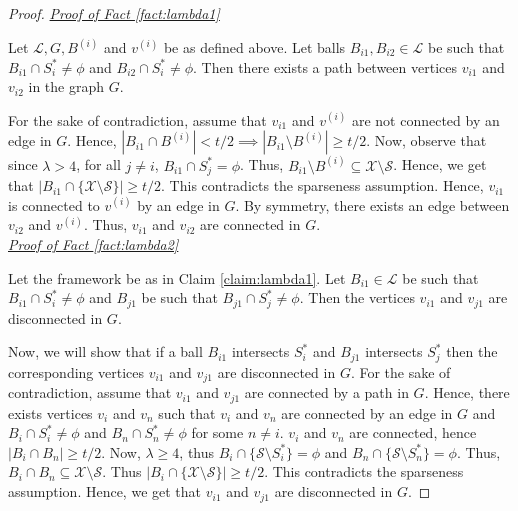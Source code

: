 \documentclass[11pt]{article}
\newcommand{\mc}{\mathcal}
\begin{document}
\begin{proof}
\noindent\textit{\underline{Proof of Fact \ref{fact:lambda1}}}
\begin{claim}
\label{claim:lambda1}
Let $\mc L, G, B^{(i)}$ and $v^{(i)}$ be as defined above. Let balls $B_{i1}, B_{i2} \in \mc L$ be such that $B_{i1} \cap S_i^* \neq \phi$ and $B_{i2} \cap S_i^* \neq \phi$. Then there exists a path between vertices $v_{i1}$ and $v_{i2}$ in the graph $G$.
\end{claim}
\vspace{-0.1in} For the sake of contradiction, assume that $v_{i1}$ and $v^{(i)}$ are not connected by an edge in $G$. Hence, $|B_{i1} \cap B^{(i)}| < t/2 \implies |B_{i1} \setminus B^{(i)}| \ge t/2$. Now, observe that since $\lambda > 4$, for all $j \neq i$, $B_{i1} \cap S_j^* = \phi$. Thus, $B_{i1} \setminus B^{(i)} \subseteq \mc X \setminus \mc S$. Hence, we get that $|B_{i1} \cap \{\mc X \setminus \mc S\}| \ge t/2$. This contradicts the sparseness assumption. Hence, $v_{i1}$ is connected to $v^{(i)}$ by an edge in $G$. By symmetry, there exists an edge between $v_{i2}$ and $v^{(i)}$. Thus, $v_{i1}$ and $v_{i2}$ are connected in $G$.\\

\noindent\textit{\underline{Proof of Fact \ref{fact:lambda2}}}
\begin{claim}
Let the framework be as in Claim \ref{claim:lambda1}. Let $B_{i1} \in \mc L$ be such that $B_{i1} \cap S_i^* \neq \phi$ and $B_{j1}$ be such that $B_{j1} \cap S_j^* \neq \phi$. Then the vertices $v_{i1}$ and $v_{j1}$ are disconnected in $G$.
\end{claim}
\vspace{-0.1in} Now, we will show that if a ball $B_{i1}$ intersects $S_i^*$ and $B_{j1}$ intersects $S_j^*$ then the corresponding vertices $v_{i1}$ and $v_{j1}$ are disconnected in $G$. For the sake of contradiction, assume that $v_{i1}$ and $v_{j1}$ are connected by a path in $G$. Hence, there exists vertices $v_{i}$ and $v_{n}$ such that $v_i$ and $v_n$ are connected by an edge in $G$ and $B_i \cap S_i^* \neq \phi$ and $B_n \cap S_n^* \neq \phi$ for some $n \neq i$. $v_i$ and $v_n$ are connected, hence $|B_i \cap B_n| \ge t/2$. Now, $\lambda \ge 4$, thus $B_i \cap \{\mc S \setminus S_i^*\} = \phi$ and $B_n \cap \{\mc S\setminus S_n^*\} = \phi$. Thus, $B_i \cap B_n \subseteq \mc X \setminus \mc S$. Thus $|B_{i} \cap \{\mc X \setminus \mc S\}| \ge t/2$. This contradicts the sparseness assumption. Hence, we get that $v_{i1}$ and $v_{j1}$ are disconnected in $G$.
\end{proof}
\end{document}
